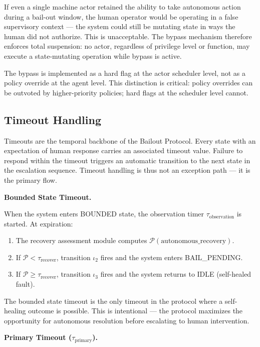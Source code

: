 If even a single machine actor retained the ability to take autonomous action during a bail-out window, the human operator would be operating in a false supervisory context — the system could still be mutating state in ways the human did not authorize. This is unacceptable. The bypass mechanism therefore enforces total suspension: no actor, regardless of privilege level or function, may execute a state-mutating operation while bypass is active.

The bypass is implemented as a hard flag at the actor scheduler level, not as a policy override at the agent level. This distinction is critical: policy overrides can be outvoted by higher-priority policies; hard flags at the scheduler level cannot.

\subsection{Timeout Handling}

Timeouts are the temporal backbone of the Bailout Protocol. Every state with an expectation of human response carries an associated timeout value. Failure to respond within the timeout triggers an automatic transition to the next state in the escalation sequence. Timeout handling is thus not an exception path — it is the primary flow.

\bigskip
\noindent\textbf{Bounded State Timeout.}

When the system enters BOUNDED state, the observation timer $\tau_{\text{observation}}$ is started. At expiration:

\begin{enumerate}
  \item The recovery assessment module computes $\mathcal{P}(\text{autonomous\_recovery})$.
  \item If $\mathcal{P} < \tau_{\text{recover}}$, transition $\iota_2$ fires and the system enters BAIL\_PENDING.
  \item If $\mathcal{P} \geq \tau_{\text{recover}}$, transition $\iota_3$ fires and the system returns to IDLE (self-healed fault).
\end{enumerate}

The bounded state timeout is the only timeout in the protocol where a self-healing outcome is possible. This is intentional — the protocol maximizes the opportunity for autonomous resolution before escalating to human intervention.

\bigskip
\noindent\textbf{Primary Timeout ($\tau_{\text{primary}}$).}


